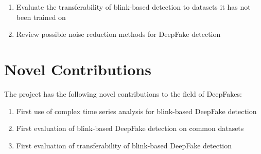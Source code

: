 \begin{enumerate}
    \item Evaluate the transferability of blink-based detection to datasets it has not been trained on
    \item Review possible noise reduction methods for DeepFake detection
\end{enumerate}

\section{Novel Contributions}
\label{sec:novel}

The project has the following novel contributions to the field of DeepFakes:

\begin{enumerate}
    \item First use of complex time series analysis for blink-based DeepFake detection
    \item First evaluation of blink-based DeepFake detection on common datasets
    \item First evaluation of transferability of blink-based DeepFake detection
\end{enumerate}